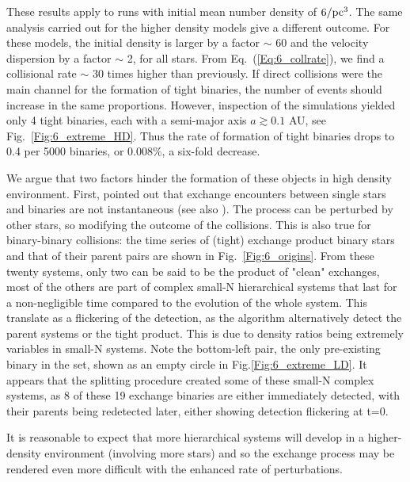 
 These results apply to runs with initial mean number density of $6 / {\textrm{pc}}^3$.  The same analysis carried out for the higher 
 density models give a different outcome. 
For these models, the initial density is larger by a factor $\sim$ 60 and the velocity dispersion  by a factor $\sim$ 2, 
for all stars. From Eq.~(\ref{Eq:6_collrate}),  we find a collisional rate  $\sim$ 30 times higher than previously. 
If direct collisions were 
the main channel for the formation of tight binaries, the number of events should  increase in the same proportions.
However, inspection of the simulations yielded only 4 tight binaries, each  with a semi-major axis $a \gtrsim 0.1$ AU, see Fig.~\ref{Fig:6_extreme_HD}. Thus the rate of formation of tight binaries drops to 0.4 per 5000 binaries, or 0.008\%, a six-fold decrease. 


We argue that two factors hinder the formation of these objects in high density environment. First, \cite{Geller2015} pointed out  that exchange encounters between single stars and binaries are not instantaneous (see also \citealt{Hut1983}).  The process can be perturbed by other stars, so modifying the outcome of the collisions. This is also true for binary-binary collisions: the time series of (tight) exchange product binary stars and that of their parent pairs are shown in Fig.~\ref{Fig:6_origins}. From these twenty systems, only two can be said to be the product of "clean" exchanges, most of the others are part of complex small-N hierarchical systems that last for a non-negligible time compared to the evolution of the whole system. This translate as a flickering of the detection, as the algorithm alternatively detect the parent systems or the tight product. This is due to density ratios being extremely variables in small-N systems. Note the bottom-left pair, the only pre-existing binary in the set, shown as an empty circle in Fig.\ref{Fig:6_extreme_LD}. It appears that the splitting procedure created some of these small-N complex systems, as 8 of these 19 exchange binaries are either immediately detected, with their parents being redetected later, either showing detection flickering at t=0. 

It is reasonable to  expect that more hierarchical systems will develop in a higher-density environment (involving more stars)  and so the exchange process may be rendered even more difficult with the enhanced rate of perturbations.



